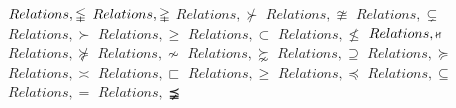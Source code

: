 \documentclass{article}
\begin{document}
$Relations,\lvertneqq$
\linebreak
\linebreak
$Relations,\gvertneqq$
\linebreak
\linebreak
$Relations,\nsucc$
\linebreak
\linebreak
$Relations,\ncong$
\linebreak
\linebreak
$Relations,\varsubsetneq$
\linebreak
\linebreak
$Relations,\succ$
\linebreak
\linebreak
$Relations,\geqslant$
\linebreak
\linebreak
$Relations,\subset$
\linebreak
\linebreak
$Relations,\nleqslant$
\linebreak
\linebreak
$Relations,\nshortparallel$
\linebreak
\linebreak
$Relations,\nsucceq$
\linebreak
\linebreak
$Relations,\nsim$
\linebreak
\linebreak
$Relations,\succnsim$
\linebreak
\linebreak
$Relations,\supseteq$
\linebreak
\linebreak
$Relations,\succeq$
\linebreak
\linebreak
$Relations,\asymp$
\linebreak
\linebreak
$Relations,\sqsubset$
\linebreak
\linebreak
$Relations,\geq$
\linebreak
\linebreak
$Relations,\preceq$
\linebreak
\linebreak
$Relations,\subseteq$
\linebreak
\linebreak
$Relations,=$
\linebreak
\linebreak
$Relations,\precneqq$
\end{document}
